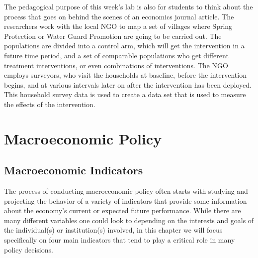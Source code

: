 \documentclass[letterpaper,10pt,english]{jupyterBook}
\begin{document}
\sphinxAtStartPar
The pedagogical purpose of this week’s lab is also for students to think about the process that goes on behind the scenes of an economics journal article. The researchers work with the local NGO to map a set of villages where Spring Protection or Water Guard Promotion are going to be carried out. The populations are divided into a control arm, which will get the intervention in a future time period, and a set of comparable populations who get different treatment interventions, or even combinations of interventions.  The NGO employs surveyors, who visit the households at baseline, before the intervention begins, and at various intervals later on after the intervention has been deployed.  This household survey data is used to create a data set that is used to measure the effects of the intervention.


\section{Macroeconomic Policy}
\label{\detokenize{content/09-macro/index:macroeconomic-policy}}\label{\detokenize{content/09-macro/index::doc}}

\subsection{Macroeconomic Indicators}
\label{\detokenize{content/09-macro/MacroChapter:macroeconomic-indicators}}\label{\detokenize{content/09-macro/MacroChapter::doc}}
\sphinxAtStartPar
The process of conducting macroeconomic policy often starts with studying and projecting the behavior of a variety of indicators that provide some information about the economy’s current or expected future performance. While there are many different variables one could look to depending on the interests and goals of the individual(s) or institution(s) involved, in this chapter we will focus specifically on four main indicators that tend to play a critical role in many policy decisions.
\end{document}
